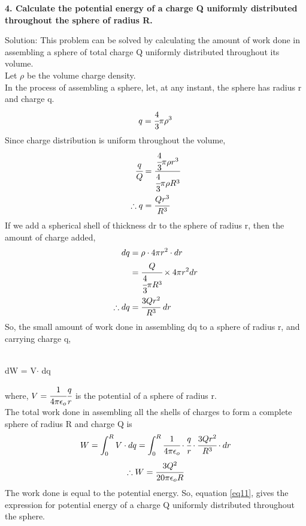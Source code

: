 \begin{tcolorbox}
\textbf{4. Calculate the potential energy of a charge Q uniformly distributed throughout the sphere of radius R.}
\end{tcolorbox}
Solution:
This problem can be solved by calculating the amount of work done in assembling a sphere of total charge Q uniformly distributed throughout its volume.\\
Let $\rho$ be the volume charge density.\\
In the process of assembling a sphere, let, at any instant, the sphere has radius r and charge q.\\
\[ q = \cfrac{4}{3}\pi \rho^3\]
Since charge distribution is uniform throughout the volume,
\begin{equation*}
\begin{split}
\cfrac{q}{Q} &= \cfrac{\cfrac{4}{3}\pi \rho r^3}{\cfrac{4}{3}\pi \rho R^3}\\
\vspace{3pt}
\therefore q &= \cfrac{Qr^3}{R^3}
\end{split}
\end{equation*} 
If we add a spherical shell of thickness dr to the sphere of radius r, then the amount of charge added,
\begin{equation*}
\begin{split}
   dq &= \rho \cdot 4\pi r^2 \cdot dr \\
   &= \cfrac{Q}{\cfrac{4}{3}\pi R^3} \times 4 \pi r^2 dr\\
   \vspace{3pt}
   \therefore dq &= \cfrac{3Qr^2}{R^3}\hspace{3pt} dr
   \end{split}
\end{equation*}
So, the small amount of work done in assembling dq to a sphere of radius r, and carrying charge q,\\\\
\begin{center}
dW = V$\cdot$ dq \hspace{5mm} \big [$\because$ Potential = Work Done / Charge]
\end{center}
where,
$V = \cfrac{1}{4\pi\epsilon_o}\cfrac{q}{r}$ is the potential of a sphere of radius r.
\\
The total work done in assembling all the shells of charges to form a complete sphere of radius R and charge Q is 
\[ W = \int _0^R V\cdot dq = \int_0^R \cfrac{1}{4 \pi \epsilon_o}\cdot \cfrac{q}{r}\cdot \cfrac{3Qr^2}{R^3}\cdot dr \]
\begin{equation}\label{eq11}
    \therefore W = \cfrac{3Q^2}{20\pi\epsilon_o R}
\end{equation}
The work done is equal to the potential energy. So, equation \ref{eq11}, gives the expression for potential energy of a charge Q uniformly distributed throughout the sphere. 

